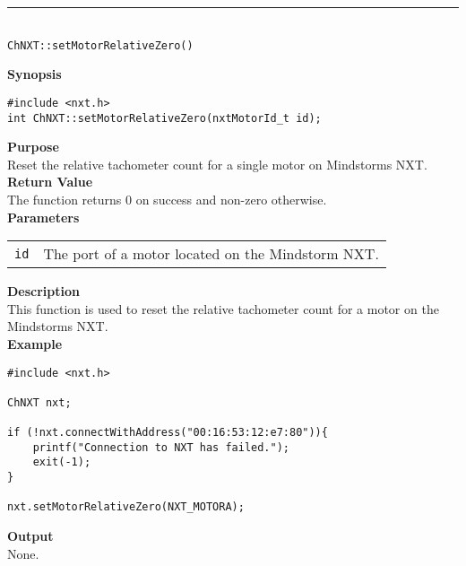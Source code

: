\noindent
\vspace{5pt}
\rule{4.5in}{0.015in}\\
\noindent
{\LARGE \texttt{ChNXT::setMotorRelativeZero()} }\\


\noindent
{\bf Synopsis}
\begin{lstlisting}
#include <nxt.h>
int ChNXT::setMotorRelativeZero(nxtMotorId_t id);
\end{lstlisting}

\noindent
{\bf Purpose}\\
Reset the relative tachometer count for a single motor on Mindstorms NXT.\\

\noindent
{\bf Return Value}\\
The function returns 0 on success and non-zero otherwise.\\

\noindent
{\bf Parameters}\\
\vspace{-0.1in}
\begin{description}
\item
\begin{tabular}{p{20mm}p{135mm}}
\texttt{id} &The port of a motor located on the Mindstorm NXT.\\
\end{tabular}
\end{description}

\noindent
{\bf Description}\\
This function is used to reset the relative tachometer count for a motor on the Mindstorms NXT.\\

\noindent
{\bf Example}
\begin{lstlisting}
#include <nxt.h> 

ChNXT nxt;

if (!nxt.connectWithAddress("00:16:53:12:e7:80")){
    printf("Connection to NXT has failed.");
    exit(-1);
}
    
nxt.setMotorRelativeZero(NXT_MOTORA);
\end{lstlisting}

\noindent
{\bf Output}\\
None.\\
\\
